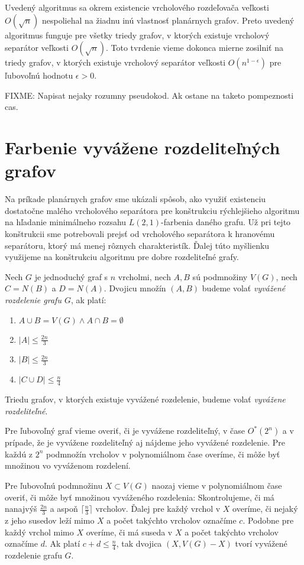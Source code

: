 Uvedený algoritmus sa okrem existencie vrcholového rozdeľovača veľkosti $O(\sqrt{n})$ nespoliehal
na žiadnu inú vlastnosť planárnych grafov. Preto uvedený algoritmus funguje pre všetky triedy grafov,
v ktorých existuje vrcholový separátor veľkosti $O(\sqrt{n})$. Toto tvrdenie vieme dokonca mierne
zosilniť na triedy grafov, v ktorých existuje vrcholový separátor veľkosti $O(n^{1 - \epsilon})$ pre
ľubovoľnú hodnotu $\epsilon > 0$.

FIXME: Napisat nejaky rozumny pseudokod. Ak ostane na taketo pompeznosti cas.

\section{Farbenie vyvážene rozdeliteľných grafov}

Na príkade planárnych grafov sme ukázali spôsob, ako využiť existenciu dostatočne malého vrcholového
separátora pre konštrukciu rýchlejšieho algoritmu na hľadanie minimálneho rozsahu $L(2,1)$-farbenia
daného grafu. Už pri tejto konštrukcii sme potrebovali prejsť od vrcholového separátora k hranovému
separátoru, ktorý má menej rôznych charakteristík. Ďalej túto myšlienku využijeme na konštrukciu
algoritmu pre dobre rozdeliteľné grafy.

\begin{defn}
    Nech $G$ je jednoduchý graf s $n$ vrcholmi, nech $A, B$ sú podmnožiny $V(G)$,
    nech $C = N(B)$ a $D = N(A)$. Dvojicu množín $(A,B)$ budeme volať \emph{vyvážené rozdelenie
    grafu $G$}, ak platí:
    \begin{enumerate}
        \item $A \cup B = V(G) \wedge A \cap B = \emptyset$
        \item $|A| \leq \frac{2n}{3}$
        \item $|B| \leq \frac{2n}{3}$
        \item $|C \cup D| \leq \frac{n}{4}$
    \end{enumerate}

    Triedu grafov, v ktorých existuje vyvážené rozdelenie, budeme volať \emph{vyvážene rozdeliteľné}.
\end{defn}

Pre ľubovoľný graf vieme overiť, či je vyvážene rozdeliteľný, v čase $O^*(2^n)$ a v prípade, že je
vyvážene rozdeliteľný aj nájdeme jeho vyvážené rozdelenie. Pre každú z $2^n$ podmnožín vrcholov
v polynomiálnom čase overíme, či môže byť množinou vo vyváženom rozdelení.

Pre ľubovoľnú podmnožinu $X \subset V(G)$ naozaj vieme
v polynomiálnom čase overiť, či môže byť množinou vyváženého rozdelenia: Skontrolujeme, či má
nanajvýš $\frac{2n}{3}$ a aspoň $\lceil \frac{n}{3} \rceil$ vrcholov. Ďalej pre každý vrchol v $X$
overíme, či nejaký z jeho susedov leží mimo $X$ a počet takýchto vrcholov označíme $c$. Podobne
pre každý vrchol mimo $X$ overíme, či má suseda v $X$ a počet takýchto vrcholov označíme $d$. Ak
platí $c + d \leq \frac{n}{4}$, tak dvojica $(X, V(G) - X)$ tvorí vyvážené rozdelenie grafu $G$.

